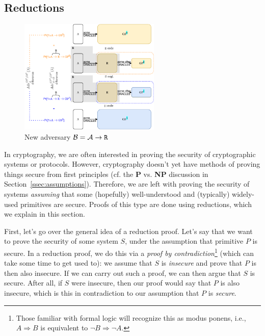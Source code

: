 \subsection{Reductions}

\begin{figure}
\vspace{-0.5cm}
\begin{center}
\includegraphics[width=0.6\textwidth]{figs/reduction}
\caption{\label{fig:reduction-example}New adversary $\mathcal{B}=\mathcal{A}\rightarrow\text{\texttt{R}}$}
\end{center}
\vspace{-0.5cm}
\end{figure}

In cryptography, we are often interested in proving the security of cryptographic systems or protocols. However, cryptography doesn't yet have methods of proving things secure from first principles (cf. the \textbf{P} vs. \textbf{NP} discussion in Section~\ref{ssec:assumptions}). Therefore, we are left with proving the security of systems \emph{assuming} that some (hopefully) well-understood and (typically) widely-used primitives are secure. Proofs of this type are done using reductions, which we explain in this section.

First, let's go over the general idea of a reduction proof.
Let's say that we want to prove the security of some system $S$, under the assumption that primitive $P$ is secure. In a reduction proof, we do this via a \emph{proof by contradiction}\footnote{Those familiar with formal logic will recognize this as modus ponens, i.e., $A\Rightarrow B$ is equivalent to $\neg B\Rightarrow \neg A$.} (which can take some time to get used to): we assume that $S$ is \emph{insecure} and prove that $P$ is then also insecure. If we can carry out such a proof, we can then argue that $S$ is secure. After all, if $S$ were insecure, then our proof would say that $P$ is also insecure, which is this in contradiction to our assumption that $P$ is \emph{secure}.

